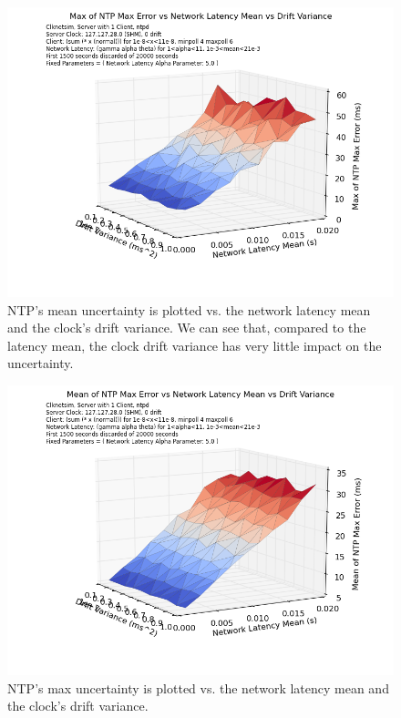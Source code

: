 \begin{figure}[t]
  \caption{NTP's mean uncertainty is plotted vs. the network latency mean and the clock's drift variance. We can see that, compared to the latency mean, the clock drift variance has very little impact on the uncertainty.}
  \label{fig:max-uncertainty_latency-mean_drift-variance}
  \includegraphics[width=0.8\linewidth]{max_max_err-mean_latency-drift_variance.png}
\end{figure}

\begin{figure}[h]
  \caption{NTP's max uncertainty is plotted vs. the network latency mean and the clock's drift variance.}
  \label{fig:mean-uncertainty_latency-mean_drift-variance}
  \includegraphics[width=0.8\linewidth]{mean_max_err-mean_latency-drift_variance.png}
\end{figure}


